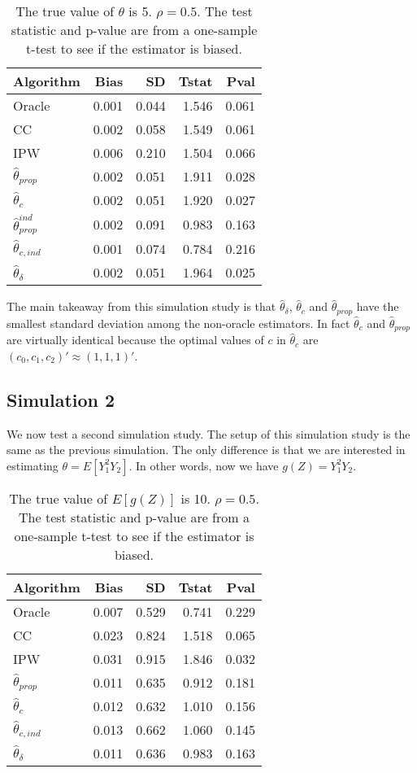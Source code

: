 \documentclass[12pt]{article}
\begin{document}
\begin{table}[ht!]
\caption{The true value of $\theta$ is 5. $\rho = 0.5$. The test statistic and 
p-value are from a one-sample t-test to see if the estimator is biased.}
\centering
\begin{tabular}[t]{lrrrr}
\toprule
Algorithm & Bias & SD & Tstat & Pval\\
\midrule
Oracle & 0.001 & 0.044 & 1.546 & 0.061\\
CC & 0.002 & 0.058 & 1.549 & 0.061\\
IPW & 0.006 & 0.210 & 1.504 & 0.066\\
$\hat \theta_{prop}$ & 0.002 & 0.051 & 1.911 & 0.028\\
$\hat \theta_{c}$ & 0.002 & 0.051 & 1.920 & 0.027\\
$\hat \theta_{prop}^{ind}$ & 0.002 & 0.091 & 0.983 & 0.163\\
$\hat \theta_{c, ind}$ & 0.001 & 0.074 & 0.784 & 0.216\\
$\hat \theta_{\delta}$ & 0.002 & 0.051 & 1.964 & 0.025\\
\bottomrule
\end{tabular}
\end{table}

The main takeaway from this simulation study is that $\hat \theta_\delta$,
$\hat \theta_c$
and $\hat\theta_{prop}$ have the smallest standard deviation among the 
non-oracle estimators. In fact $\hat \theta_c$ and $\hat \theta_{prop}$ are 
virtually identical because the optimal values of $c$ in $\hat \theta_c$ 
are $(c_0, c_1, c_2)' \approx (1, 1, 1)'$.

\subsection*{Simulation 2}

We now test a second simulation study. The setup of this simulation study 
is the same as the previous simulation. The only difference is that we 
are interested in estimating $\theta = E[Y_1^2 Y_2]$. In other words, now 
we have $g(Z) = Y_1^2 Y_2$.

\begin{table}[ht!]
  \caption{The true value of $E[g(Z)]$ is 10. $\rho = 0.5$. The test statistic and 
p-value are from a one-sample t-test to see if the estimator is biased.}
\centering
\begin{tabular}[t]{lrrrr}
\toprule
Algorithm & Bias & SD & Tstat & Pval\\
\midrule
Oracle & 0.007 & 0.529 & 0.741 & 0.229\\
CC & 0.023 & 0.824 & 1.518 & 0.065\\
IPW & 0.031 & 0.915 & 1.846 & 0.032\\
$\hat \theta_{prop}$ & 0.011 & 0.635 & 0.912 & 0.181\\
$\hat \theta_{c}$ & 0.012 & 0.632 & 1.010 & 0.156\\
$\hat \theta_{c, ind}$ & 0.013 & 0.662 & 1.060 & 0.145\\
$\hat \theta_{\delta}$ & 0.011 & 0.636 & 0.983 & 0.163\\
\bottomrule
\end{tabular}
\end{table}
\end{document}
